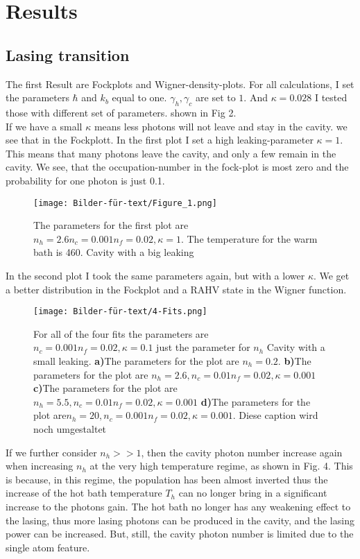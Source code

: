 \documentclass[12pt,a4paper]{article}
\begin{document}
\section{Results}
\subsection{Lasing transition}
The first Result are Fockplots and Wigner-density-plots.
For all calculations, I set the parameters  $\hbar$ and $k_b$ equal to one. $\gamma_h, \gamma_c $ are set to $ 1$. And $\kappa=0.028$
I tested those with different set of parameters. 
shown in Fig 2.\\

If we have a small $\kappa$ means less photons will not leave and stay in the cavity. we see that in the Fockplott.
In the first plot I set a high leaking-parameter $\kappa=1$.
This means that many photons leave the cavity, and only a few remain in the cavity. 
We see, that the occupation-number in the fock-plot is most zero and the probability for one photon is just 0.1.

\begin{figure}[hbtp]
\centering
\texttt{[image: Bilder-für-text/Figure\_1.png]}
\caption{The parameters for the first plot are$ n_h=2.6 n_c=0.001 n_f=0.02,\kappa=1$. The temperature for the warm bath is 460. Cavity with a big leaking}
\end{figure}\newpage

In the second plot I took the same parameters again, but with a lower $\kappa$. We get a better distribution in the Fockplot and a RAHV state in the Wigner function. 

\begin{figure}[h!]
\centering
\texttt{[image: Bilder-für-text/4-Fits.png]}
\caption{For all of the four fits the parameters are $n_c=0.001 n_f=0.02,\kappa=0.1$ just the parameter for $n_h$ Cavity with a small leaking.
\textbf{a)}The parameters for the plot are $n_h=0.2 $.
\textbf{b)}The parameters for the plot are $ n_h=2.6, n_c=0.01 n_f=0.02,\kappa=0.001$ 
\textbf{c)}The parameters for the plot are $ n_h=5.5, n_c=0.01 n_f=0.02,\kappa=0.001$ 
\textbf{d)}The parameters for the plot are$ n_h=20, n_c=0.001 n_f=0.02,\kappa=0.001$. 
Diese caption wird noch umgestaltet}
\end{figure}

If we further consider  $n_h >>1$,
then the cavity photon number increase again when increasing $n_h$ at the very
high temperature regime, as shown in Fig. 4. This is because,
in this regime, the population has been almost inverted
thus the increase of the hot bath temperature $T_h$
can no longer bring in a significant increase to the photons gain.
The hot bath no longer has
any weakening effect to the lasing, thus more lasing photons
can be produced in the cavity, and the lasing power can be
increased. But, still, the cavity photon number is limited due to
the single atom feature.%
\end{document}
